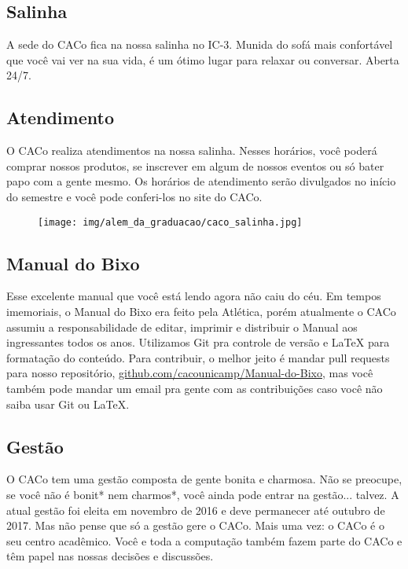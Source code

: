 \subsection{Salinha}

A sede do CACo fica na nossa salinha no IC-3. Munida do sofá mais confortável
que você vai ver na sua vida, é um ótimo lugar para relaxar ou conversar.
Aberta 24/7.

\subsection{Atendimento}

O CACo realiza atendimentos na nossa salinha. Nesses horários, você poderá
comprar nossos produtos, se inscrever em algum de nossos eventos ou só bater
papo com a gente mesmo. Os horários de atendimento serão divulgados no início do
semestre e você pode conferi-los no site do CACo.

\begin{figure}[H]
    \centering
    \texttt{[image: img/alem\_da\_graduacao/caco\_salinha.jpg]}
\end{figure}

\subsection{Manual do Bixo}

Esse excelente manual que você está lendo agora não caiu do céu. Em tempos
imemoriais, o Manual do Bixo era feito pela Atlética, porém atualmente o CACo
assumiu a responsabilidade de editar, imprimir e distribuir o Manual aos
ingressantes todos os anos. Utilizamos Git pra controle de versão e {\LaTeX }
para formatação do conteúdo. Para contribuir, o melhor jeito é mandar pull
requests para nosso repositório, \url{github.com/cacounicamp/Manual-do-Bixo},
mas você também pode mandar um email pra gente com as contribuições caso você
não saiba usar Git ou \LaTeX.

\subsection{Gestão}

O CACo tem uma gestão composta de gente bonita e charmosa. Não se preocupe, se
você não é bonit* nem charmos*, você ainda pode entrar na gestão... talvez. A
atual gestão foi eleita em novembro de 2016 e deve permanecer até outubro de
2017. Mas não pense que só a gestão gere o CACo. Mais uma vez: o CACo é o seu
centro acadêmico. Você e toda a computação também fazem parte do CACo e têm
papel nas nossas decisões e discussões.

